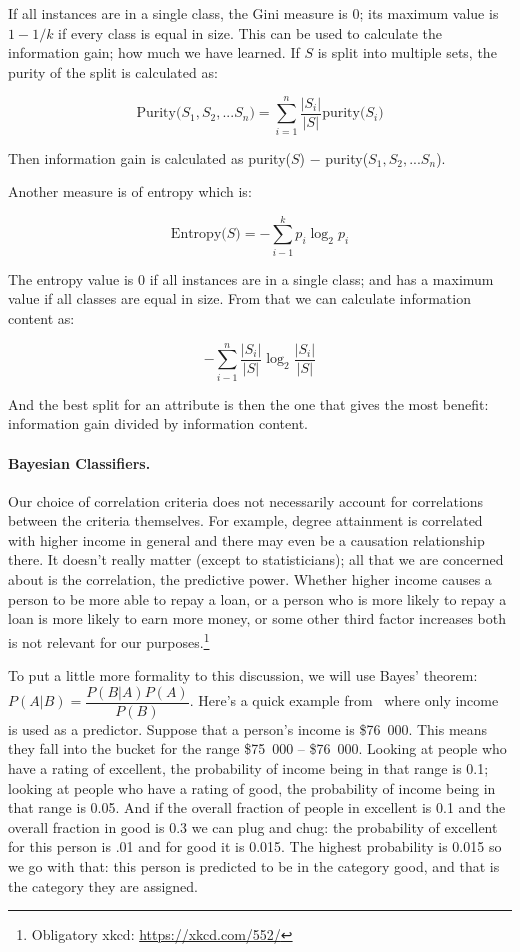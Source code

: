 If all instances are in a single class, the Gini measure is 0; its maximum value is $1-1/k$ if every class is equal in size. This can be used to calculate the information gain; how much we have learned. If $S$ is split into multiple sets, the purity of the split is calculated as:

$$\mbox{Purity($S_{1}, S_{2}, ... S_{n}$)} = \sum_{i = 1}^{n}\dfrac{|S_{i}|}{|S|} \mbox{purity($S_{i}$)}$$

Then information gain is calculated as purity($S$) $-$ purity($S_{1}, S_{2}, ... S_{n}$).

Another measure is of entropy which is:

$$\mbox{Entropy($S$)} = - \sum_{i-1}^{k}p_{i} \log_{2} p_{i}$$

The entropy value is 0 if all instances are in a single class; and has a maximum value if all classes are equal in size. From that we can calculate information content as:

$$ - \sum_{i-1}^{n} \dfrac{|S_{i}|}{|S|}  \log_{2} \dfrac{|S_{i}|}{|S|} $$

And the best split for an attribute is then the one that gives the most benefit: information gain divided by information content.

\paragraph{Bayesian Classifiers.} Our choice of correlation criteria does not necessarily account for correlations between the criteria themselves. For example, degree attainment is correlated with higher income  in general and there may even be a causation relationship there. It doesn't really matter (except to statisticians); all that we are concerned about is the correlation, the predictive power. Whether higher income causes a person to be more able to repay a loan, or a person who is more likely to repay a loan is more likely to earn more money, or some other third factor increases both is not relevant for our purposes.\footnote{Obligatory xkcd: \url{https://xkcd.com/552/} }

To put a little more formality to this discussion, we will use Bayes' theorem: $P(A|B) = \dfrac{P(B|A)P(A)}{P(B)}$. Here's a quick example  from~\cite{dsc} where only income is used as a predictor. Suppose that a person's income is \$76~000. This means they fall into the bucket for the range \$75~000 -- \$76~000. Looking at people who have a rating of excellent, the probability of income being in that range is 0.1; looking at people who have a rating of good, the probability of income being in that range is 0.05. And if the overall fraction of people in excellent is 0.1 and the overall fraction in good is 0.3 we can plug and chug: the probability of excellent for this person is .01 and for good it is 0.015. The highest probability is 0.015 so we go with that: this person is predicted to be in the category good, and that is the category they are assigned.

